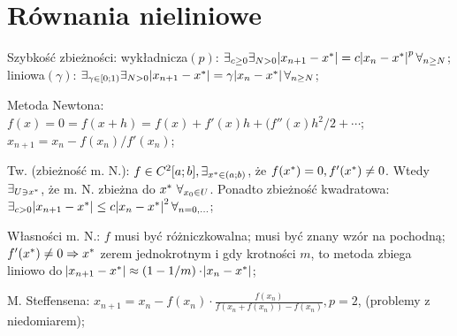 \section{Równania nieliniowe}



\entry
Szybkość zbieżności:
wykładnicza$(p)$:
$\exists_{c \geq 0} \exists_{N > 0}
\abs{x_{n + 1} - x^{*}} = c \abs{x_n - x^{*}}^p \forall_{n \geq N}$;
liniowa$(\gamma)$:
$\exists_{\gamma \in [0;1)} \exists_{N > 0}
\abs{x_{n + 1} - x^{*}} = \gamma \abs{x_n - x^{*}} \forall_{n \geq N}$;

\entry
Metoda Newtona:
$f(x) = 0 = f(x+h) = f(x) + f'(x)h + (f''(x)h^2/2+\cdots$;
$x_{n+1} = x_n - f(x_n)/f'(x_n)$;

\entry
Tw. (zbieżność m. N.):
$f \in C^2[a;b], \exists_{x^{*} \in (a;b)}$,
że $f(x^{*})=0, f'(x^{*}) \neq 0$.
Wtedy $\exists_{U \ni x^{*}}$, że m. N. zbieżna do $x^{*} \ \forall_{x_0 \in U}$.
Ponadto zbieżność kwadratowa:
$\exists_{c>0} \abs{x_{n+1} - x^{*}} \leq c \abs{x_n - x^{*}}^2 \forall_{n=0,\ldots}$;

\entry
Własności m. N.:
\subentry
$f$ musi być różniczkowalna;
\subentry
musi być znany wzór na pochodną;
\subentry
$f'(x^{*}) \neq 0 \Rightarrow x^{*}$ zerem jednokrotnym i gdy krotności $m$, 
to metoda zbiega liniowo do 
$\abs{x_{n+1} - x^{*}} \approx (1-1/m) \cdot \abs{x_n - x^{*}}$;



\entry
M. Steffensena:
$x_{n+1} = x_n - f(x_n) \cdot \frac{f(x_n)}{f(x_n + f(x_n)) - f(x_n)}, p=2$,
(problemy z niedomiarem);




